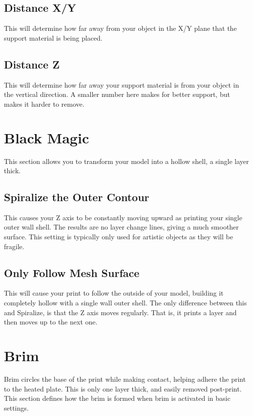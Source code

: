 \subsection{Distance X/Y}
This will determine how far away from your object in the X/Y plane that the support material is being placed.

\subsection{Distance Z}
This will determine how far away your support material is from your object in the vertical direction. A smaller number here makes for better support, but makes it harder to remove.

\section{Black Magic}
This section allows you to transform your model into a hollow shell, a single layer thick.

\subsection{Spiralize the Outer Contour}
This causes your Z axis to be constantly moving upward as printing your single outer wall shell. The results are no layer change lines, giving a much smoother surface. This setting is typically only used for artistic objects as they will be fragile.

\subsection{Only Follow Mesh Surface}
This will cause your print to follow the outside of your model, building it completely hollow with a single wall outer shell. The only difference between this and Spiralize, is that the Z axis moves regularly. That is, it prints a layer and then moves up to the next one.

\section{Brim}
Brim circles the base of the print while making contact, helping adhere the print to the heated plate. This is only one layer thick, and easily removed post-print. This section defines how the brim is formed when brim is activated in basic settings.

